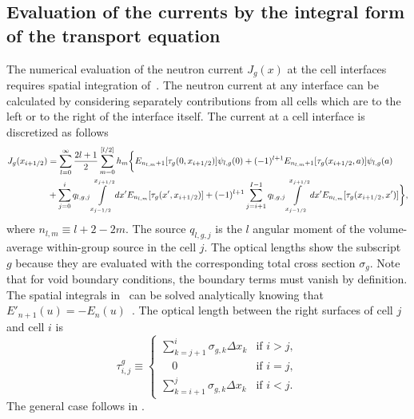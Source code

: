 \subsection{Evaluation of the currents by the integral form of the transport equation}
\label{sec:calc-int-curr}

The numerical evaluation of the neutron current $J_g(x)$ at the cell interfaces requires spatial integration of~. The neutron current at any interface can be calculated by considering separately contributions from all cells which are to the left or to the right of the interface itself. The current at a cell interface is discretized as follows
\begin{equation}\label{eq:tot-J-disc}
\begin{split}
J_g(x_{i+1/2}) &= \sum\limits_{l=0}^\infty \frac{2l+1}{2}
\sum\limits_{m=0}^{[l/2]} h_m
\bigg\{
E_{n_{l,m}+1}[\tau_g(0,x_{i+1/2})] \psi_{l,g}(0) 
+(-1)^{l+1} E_{n_{l,m}+1}[\tau_g(x_{i+1/2},a)]\psi_{l,g}(a) \\
&+
\sum\limits_{j=0}^i q_{l,g,j}\int\limits_{x_{j-1/2}}^{x_{j+1/2}} dx'
E_{n_{l,m}}[\tau_g(x',x_{i+1/2})] + (-1)^{l+1} 
\sum\limits_{j=i+1}^{I-1} q_{l,g,j}\int\limits_{x_{j-1/2}}^{x_{j+1/2}} dx'
E_{n_{l,m}}[\tau_g(x_{i+1/2},x')]
\bigg\},
\end{split}
\end{equation}
where $n_{l,m}\equiv l+2-2m$. The source $q_{l,g,j}$ is the $l$ angular moment of the volume-average within-group source in the cell $j$. The optical lengths show the subscript $g$ because they are evaluated with the corresponding total cross section $\sigma_g$. Note that for void boundary conditions, the boundary terms must vanish by definition. The spatial integrals in~ can be solved analytically knowing that $E'_{n+1}(u) = -E_n(u)$~\cite{Gradshteyn-2007}. The optical length between the right surfaces of cell $j$ and cell $i$ is
\begin{equation}\label{eq:psi_w_left_right}
\tau^g_{i,j} \equiv \begin{cases}
\sum\limits_{k=j+1}^i \sigma_{g,k}\Delta x_k 
& \text{if } i > j, \\
\quad 0 & \text{if } i = j, \\
\sum\limits_{k=i+1}^{j} \sigma_{g,k}\Delta x_k &\text{if } i < j.
\end{cases}
\end{equation}
The general case follows in .


